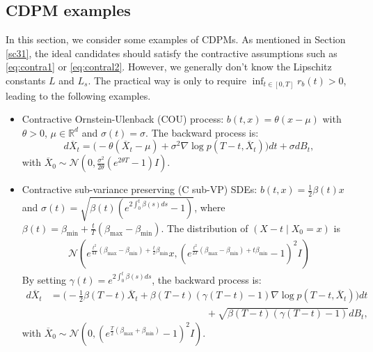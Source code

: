 \documentclass[letterpaper,11pt,reqno]{amsart}
\numberwithin{equation}{section}
\begin{document}
\subsection{CDPM examples}
\quad In this section, we consider some examples of CDPMs. 
As mentioned in Section \ref{sc31},
the ideal candidates should satisfy 
the contractive assumptions such as \eqref{eq:contra1} 
or \eqref{eq:contral2}.
However, we generally don't know the Lipschitz constants $L$ and $L_s$.
The practical way is only to require 
$\inf_{t\in\left[0,T\right]}r_b(t)>0$, 
leading to the following examples.
\begin{itemize}[itemsep = 3 pt]
\item 
Contractive Ornstein-Ulenback (COU) process: 
$b(t,x) = \theta (x - \mu)$ with $\theta > 0$, $\mu \in \mathbb{R}^d$ and $\sigma(t) = \sigma$.
The backward process is:
\begin{equation}
d\overline{X}_t = \bigg(-\theta (\overline{X}_t - \mu)  + \sigma^2 \nabla \log p(T-t, \overline{X}_t)\bigg)  dt + \sigma dB_t,
\end{equation}
with $\overline{X}_0 \sim \mathcal{N}\left(0,  
\frac{\sigma^2}{2\theta} ( e^{2 \theta T} -1) I \right)$.
\item 
Contractive sub-variance preserving (C sub-VP) SDEs:
$b(t,x) = \frac{1}{2} \beta(t)x$ and $\sigma(t) = \sqrt{\beta(t) (e^{2\int_0^t \beta(s) ds}-1)}$,
where $\beta(t)= \beta_{\min} + \frac{t}{T}(\beta_{\max} - \beta_{\min})$. The distribution of $(X-t\mid X_0=x)$ is
\begin{equation}
\begin{aligned}
\mathcal{N}\left( e^{\frac{t^2}{4T}(\beta_{\max} - \beta_{\min}) + \frac{t}{2} \beta_{\min}}  x,  
(e^{\frac{t^2}{2T}(\beta_{\max} - \beta_{\min}) + t \beta_{\min}}-1 )^2 I \right)
\end{aligned}
\end{equation}
By setting $\gamma(t)= e^{2 \int_0^t \beta(s) ds}$,
the backward process is: 
\begin{equation}
\begin{aligned}
d\overline{X}_t & = \bigg(-\frac{1}{2} \beta(T-t) \overline{X}_t  + \beta(T-t)(\gamma(T-t)-1) \nabla \log p(T-t, \overline{X}_t)\bigg)  dt \\
& \qquad \qquad \qquad \qquad \qquad \qquad \qquad \qquad+ \sqrt{\beta(T-t) (\gamma(T-t)-1)} dB_t,
\end{aligned}
\end{equation}
with $\overline{X}_0 \sim \mathcal{N}\left( 0, 
(e^{\frac{T}{2} (\beta_{\max} + \beta_{\min})}-1 )^2 I \right)$.
\end{itemize}
\end{document}
